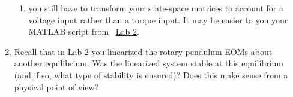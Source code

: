 \documentclass[12pt]{report}
\newcommand\drew[1]{\textcolor{red}{#1}}
\begin{document}
\begin{enumerate}
\begin{enumerate}
              \item you still have to transform your state-space matrices to account for a voltage input rather than a torque input. It may be easier to you your MATLAB script from ~\hyperref[lab2:linearization_validity]{Lab 2}.
          \end{enumerate}
    \item Recall that in Lab 2 you linearized the rotary pendulum EOMs about another equilibrium. Was the linearized system stable at this equilibrium (and if so, what type of stability is ensured)? Does this make sense from a physical point of view?\\

\end{enumerate}
\end{document}
